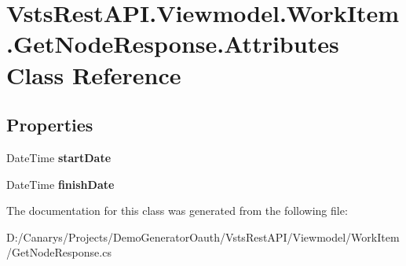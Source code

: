 \hypertarget{class_vsts_rest_a_p_i_1_1_viewmodel_1_1_work_item_1_1_get_node_response_1_1_attributes}{}\section{Vsts\+Rest\+A\+P\+I.\+Viewmodel.\+Work\+Item.\+Get\+Node\+Response.\+Attributes Class Reference}
\label{class_vsts_rest_a_p_i_1_1_viewmodel_1_1_work_item_1_1_get_node_response_1_1_attributes}
\subsection*{Properties}
\begin{DoxyCompactItemize}
\item 
\mbox{\label{class_vsts_rest_a_p_i_1_1_viewmodel_1_1_work_item_1_1_get_node_response_1_1_attributes_ab0f5f7ad16ca175fb94d8820ae9617ca}} 
Date\+Time {\bfseries start\+Date}
\item 
\mbox{\label{class_vsts_rest_a_p_i_1_1_viewmodel_1_1_work_item_1_1_get_node_response_1_1_attributes_a8c5d54b66442d513882f6a164221b489}} 
Date\+Time {\bfseries finish\+Date}
\end{DoxyCompactItemize}


The documentation for this class was generated from the following file\+:\begin{DoxyCompactItemize}
\item 
D\+:/\+Canarys/\+Projects/\+Demo\+Generator\+Oauth/\+Vsts\+Rest\+A\+P\+I/\+Viewmodel/\+Work\+Item/Get\+Node\+Response.\+cs\end{DoxyCompactItemize}
